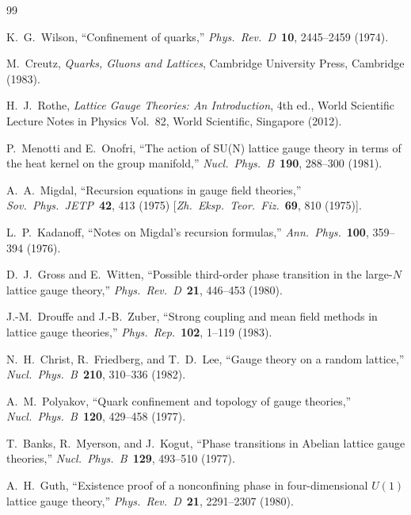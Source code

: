 \documentclass[11pt]{article}
\begin{document}
\begin{thebibliography}{99}

K.~G.~Wilson, ``Confinement of quarks,''
\textit{Phys.~Rev.~D}\ \textbf{10}, 2445--2459 (1974).

M.~Creutz, \textit{Quarks, Gluons and Lattices},
Cambridge University Press, Cambridge (1983).

H.~J.~Rothe, \textit{Lattice Gauge Theories: An Introduction}, 4th ed.,
World Scientific Lecture Notes in Physics Vol.~82, World Scientific,
Singapore (2012).

P.~Menotti and E.~Onofri, ``The action of SU(N) lattice gauge
theory in terms of the heat kernel on the group manifold,''
\textit{Nucl.~Phys.~B}\ \textbf{190}, 288--300 (1981).

A.~A.~Migdal, ``Recursion equations in gauge field theories,''
\textit{Sov.~Phys.~JETP}\ \textbf{42}, 413 (1975)
[\textit{Zh.~Eksp.~Teor.~Fiz.}\ \textbf{69}, 810 (1975)].

L.~P.~Kadanoff, ``Notes on Migdal's recursion formulas,''
\textit{Ann.~Phys.}\ \textbf{100}, 359--394 (1976).

D.~J.~Gross and E.~Witten, ``Possible third-order phase transition in the
large-$N$ lattice gauge theory,''
\textit{Phys.~Rev.~D}\ \textbf{21}, 446--453 (1980).

J.-M.~Drouffe and J.-B.~Zuber, ``Strong coupling and mean field methods in
lattice gauge theories,''
\textit{Phys.~Rep.}\ \textbf{102}, 1--119 (1983).

N.~H.~Christ, R.~Friedberg, and T.~D.~Lee, ``Gauge theory on a random
lattice,'' \textit{Nucl.~Phys.~B}\ \textbf{210}, 310--336 (1982).

A.~M.~Polyakov, ``Quark confinement and topology of gauge theories,''
\textit{Nucl.~Phys.~B}\ \textbf{120}, 429--458 (1977).

T.~Banks, R.~Myerson, and J.~Kogut, ``Phase transitions in Abelian lattice
gauge theories,''
\textit{Nucl.~Phys.~B}\ \textbf{129}, 493--510 (1977).

A.~H.~Guth, ``Existence proof of a nonconfining phase in four-dimensional
$U(1)$ lattice gauge theory,''
\textit{Phys.~Rev.~D}\ \textbf{21}, 2291--2307 (1980).


\end{thebibliography}
\end{document}
